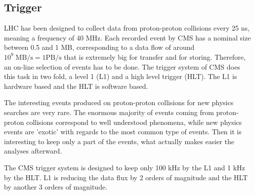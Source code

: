 %
%
%
\subsection{Trigger}
\label{sec:trigger}

LHC has been designed to collect data from proton-proton collisions every 25 ns, meaning a frequency of 40 MHz. Each recorded event by CMS has a nominal size between 0.5 and 1 MB, corresponding to a data flow of around $10^{9}\; \text{MB/s}= 1\text{PB/s}$ that is extremely big for transfer and for storing. Therefore, an on-line selection of events has to be done. The trigger system of CMS does this task in two fold, a level 1 (L1) and a high level trigger (HLT). The L1 is hardware based and the HLT is software based. 

The interesting events produced on proton-proton collisions for new physics searches are very rare. The enormous majority of events coming from proton-proton collisions correspond to well understood phenomena, while new physics events are 'exotic' with regards to the most common type of events. Then it is interesting to keep only a part of the events, what actually makes easier the analyses afterward. 

The CMS trigger system is designed to keep only 100 kHz by the L1 and 1 kHz by the HLT. L1 is reducing the data flux by 2 orders of magnitude and the HLT by another 3 orders of magnitude.
%

